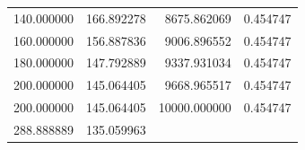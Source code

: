 \documentclass[a4paper,twoside,10pt]{article}
\begin{document}
\begin{tabular}{rr|rr}
	 140.000000 & 166.892278 & 8675.862069 & 0.454747 \\
	 160.000000 & 156.887836 & 9006.896552 & 0.454747 \\
	 180.000000 & 147.792889 & 9337.931034 & 0.454747 \\
	 200.000000 & 145.064405 & 9668.965517 & 0.454747 \\
	 200.000000 & 145.064405 & 10000.000000 & 0.454747 \\
	 288.888889 & 135.059963 & & \\
	\bottomrule
\end{tabular}
\end{document}
